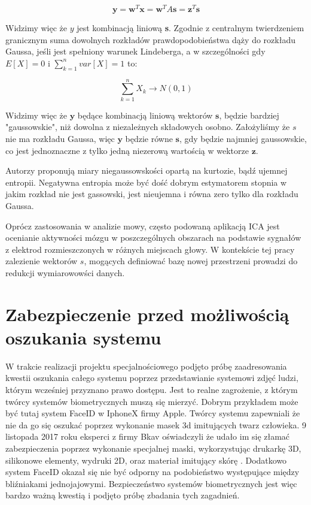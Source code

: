 \documentclass[oneside, eng]{mgr}
\newcommand{\bb}{\textbf}
\begin{document}
\begin{equation}
	\bb{y} = \bb{w}^T \bb{x} = \bb{w}^T A \bb{s} = \bb{z}^T \bb{s} 
\end{equation}

Widzimy więc że $y$ jest kombinacją liniową \bb{s}. Zgodnie z centralnym twierdzeniem granicznym suma dowolnych rozkładów prawdopodobieństwa dąży do rozkładu Gaussa, jeśli jest spełniony warunek Lindeberga, a w szczególności gdy $E[X] = 0$ i $\sum_{k=1}^{n}var[X] = 1$ to:

\begin{equation}
	\sum_{k=1}^{n} X_k \to N(0,1)
\end{equation}

Widzimy więc że $\bb{y}$ będące kombinacją liniową wektorów $\bb{s}$, będzie bardziej "gaussowskie", niż dowolna z niezależnych składowych osobno. Założyliśmy że $s$ nie ma rozkładu Gaussa, więc $\bb{y}$ będzie równe $\bb{s}$, gdy będzie najmniej gaussowskie, co jest jednoznaczne z tylko jedną niezerową wartością w wektorze $\bb{z}$.

Autorzy \cite{ICA} proponują miary niegaussowskości opartą na kurtozie, bądź ujemnej entropii. Negatywna entropia może być dość dobrym estymatorem stopnia w jakim rozkład nie jest gassowski, jest nieujemna i równa zero tylko dla rozkładu Gaussa.


Oprócz zastosowania w analizie mowy, często podowaną aplikacją ICA jest ocenianie aktywności mózgu w poszczególnych obszarach na podstawie sygnałów z elektrod rozmieszczonych w różnych miejscach głowy. W kontekście tej pracy zalezienie wektorów $s$, mogących definiować bazę nowej przestrzeni prowadzi do redukcji wymiarowowści danych.

\newpage

\chapter{Zabezpieczenie przed możliwością oszukania systemu}

W trakcie realizacji projektu specjalnościowego podjęto próbę zaadresowania kwestii oszukania całego systemu poprzez przedstawianie systemowi zdjęć ludzi, którym wcześniej przyznano prawo dostępu. Jest to realne zagrożenie, z którym twórcy systemów biometrycznych muszą się mierzyć. Dobrym przykładem może być tutaj system FaceID w IphoneX firmy Apple. Twórcy systemu zapewniali że nie da go się oszukać poprzez wykonanie masek 3d imitujących twarz człowieka. 9 listopada 2017 roku eksperci z firmy Bkav oświadczyli że udało im się złamać zabezpieczenia poprzez wykonanie specjalnej maski, wykorzystując drukarkę 3D, silikonowe elementy, wydruki 2D, oraz materiał imitujący skórę \cite{FaceID hacked}. Dodatkowo system FaceID okazał się nie być odporny na podobieństwo występujące między bliźniakami jednojajowymi. Bezpieczeństwo systemów biometrycznych jest więc bardzo ważną kwestią i podjęto próbę zbadania tych zagadnień.
\end{document}
